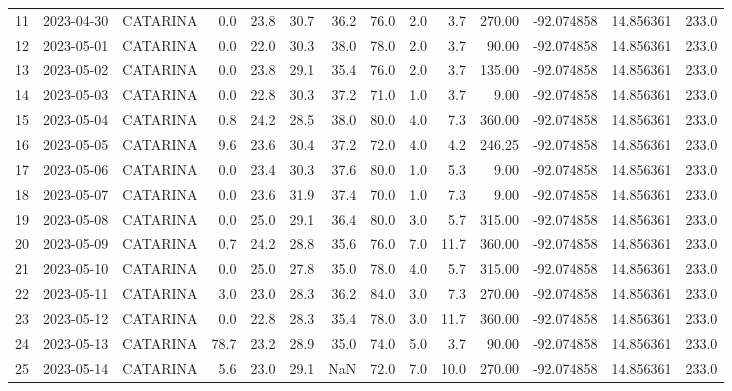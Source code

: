 \documentclass[12pt]{article}
\begin{document}
\begin{center}
\begin{tabular}{lllrrrrrrrrrrr}
11  & 2023-04-30 &  CATARINA &     0.0 &  23.8 &   30.7 &  36.2 &     76.0 &  2.0 &         3.7 &      270.00 & -92.074858 &  14.856361 &    233.0 \\
12  & 2023-05-01 &  CATARINA &     0.0 &  22.0 &   30.3 &  38.0 &     78.0 &  2.0 &         3.7 &       90.00 & -92.074858 &  14.856361 &    233.0 \\
13  & 2023-05-02 &  CATARINA &     0.0 &  23.8 &   29.1 &  35.4 &     76.0 &  2.0 &         3.7 &      135.00 & -92.074858 &  14.856361 &    233.0 \\
14  & 2023-05-03 &  CATARINA &     0.0 &  22.8 &   30.3 &  37.2 &     71.0 &  1.0 &         3.7 &        9.00 & -92.074858 &  14.856361 &    233.0 \\
15  & 2023-05-04 &  CATARINA &     0.8 &  24.2 &   28.5 &  38.0 &     80.0 &  4.0 &         7.3 &      360.00 & -92.074858 &  14.856361 &    233.0 \\
16  & 2023-05-05 &  CATARINA &     9.6 &  23.6 &   30.4 &  37.2 &     72.0 &  4.0 &         4.2 &      246.25 & -92.074858 &  14.856361 &    233.0 \\
17  & 2023-05-06 &  CATARINA &     0.0 &  23.4 &   30.3 &  37.6 &     80.0 &  1.0 &         5.3 &        9.00 & -92.074858 &  14.856361 &    233.0 \\
18  & 2023-05-07 &  CATARINA &     0.0 &  23.6 &   31.9 &  37.4 &     70.0 &  1.0 &         7.3 &        9.00 & -92.074858 &  14.856361 &    233.0 \\
19  & 2023-05-08 &  CATARINA &     0.0 &  25.0 &   29.1 &  36.4 &     80.0 &  3.0 &         5.7 &      315.00 & -92.074858 &  14.856361 &    233.0 \\
20  & 2023-05-09 &  CATARINA &     0.7 &  24.2 &   28.8 &  35.6 &     76.0 &  7.0 &        11.7 &      360.00 & -92.074858 &  14.856361 &    233.0 \\
21  & 2023-05-10 &  CATARINA &     0.0 &  25.0 &   27.8 &  35.0 &     78.0 &  4.0 &         5.7 &      315.00 & -92.074858 &  14.856361 &    233.0 \\
22  & 2023-05-11 &  CATARINA &     3.0 &  23.0 &   28.3 &  36.2 &     84.0 &  3.0 &         7.3 &      270.00 & -92.074858 &  14.856361 &    233.0 \\
23  & 2023-05-12 &  CATARINA &     0.0 &  22.8 &   28.3 &  35.4 &     78.0 &  3.0 &        11.7 &      360.00 & -92.074858 &  14.856361 &    233.0 \\
24  & 2023-05-13 &  CATARINA &    78.7 &  23.2 &   28.9 &  35.0 &     74.0 &  5.0 &         3.7 &       90.00 & -92.074858 &  14.856361 &    233.0 \\
25  & 2023-05-14 &  CATARINA &     5.6 &  23.0 &   29.1 &   NaN &     72.0 &  7.0 &        10.0 &      270.00 & -92.074858 &  14.856361 &    233.0 \\
\bottomrule
\end{tabular}

        
        \end{center}
        
\end{document}
